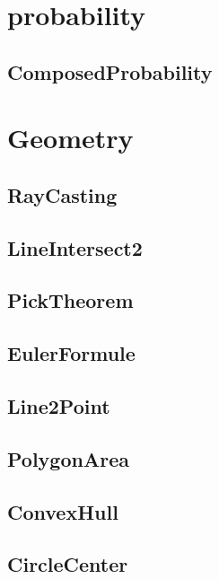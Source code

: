 \section{probability}
\subsection{ ComposedProbability}
\raggedbottom
\hrulefill

\section{Geometry}
\subsection{ RayCasting}
\raggedbottom
\hrulefill
\subsection{ LineIntersect2}
\raggedbottom
\hrulefill
\subsection{ PickTheorem}
\raggedbottom
\hrulefill
\subsection{ EulerFormule}
\raggedbottom
\hrulefill
\subsection{ Line2Point}
\raggedbottom
\hrulefill
\subsection{ PolygonArea}
\raggedbottom
\hrulefill
\subsection{ ConvexHull}
\raggedbottom
\hrulefill
\subsection{ CircleCenter}
\raggedbottom
\hrulefill

